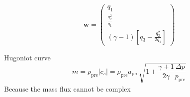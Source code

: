 \documentclass{article}
\begin{document}
\begin{equation}
\mathbf{w}=
\begin{pmatrix}
q_1\\
\frac{q_2^2}{q_1}\\
(\gamma-1)\left[q_3-\frac{q_2^2}{2q_1}\right]
\end{pmatrix}
\end{equation}



Hugoniot curve
\begin{equation}
m=\rho_{\mathrm{pre}}|c_s|=\rho_{\mathrm{pre}}a_{\mathrm{pre}}\sqrt{1+\frac{\gamma+1}{2\gamma}\frac{\Delta p}{p_{\mathrm{pre}}}}
\end{equation}
Because the mass flux cannot be complex

% 
\end{document}
